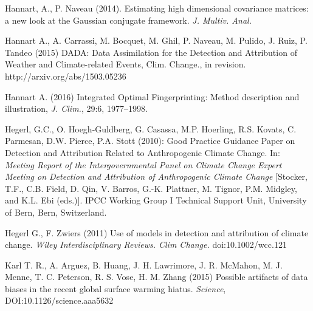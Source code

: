 \documentclass[12pt]{article}
\begin{document}
\begin{thebibliography}{00}
Hannart, A., P. Naveau (2014). Estimating high dimensional covariance matrices: a new look at the Gaussian conjugate framework. {\em J. Multiv. Anal.}

Hannart A., A. Carrassi, M. Bocquet, M. Ghil, P. Naveau, M. Pulido, J. Ruiz, P. Tandeo (2015) DADA: Data Assimilation for the Detection and Attribution of Weather and Climate-related Events, {Clim. Change.}, in revision. http://arxiv.org/abs/1503.05236

Hannart A. (2016) Integrated Optimal Fingerprinting: Method description and illustration, {\em J. Clim.}, 29:6, 1977--1998.

%
%

Hegerl, G.C., O. Hoegh-Guldberg, G. Casassa, M.P. Hoerling, R.S. Kovats, C. Parmesan, D.W. Pierce, P.A. Stott (2010): Good Practice Guidance Paper on Detection and Attribution Related to Anthropogenic Climate Change. In: {\em Meeting Report of the Intergovernmental Panel on Climate Change Expert Meeting on Detection and Attribution of Anthropogenic Climate Change} [Stocker, T.F., C.B. Field, D. Qin, V. Barros, G.-K. Plattner, M. Tignor, P.M. Midgley, and K.L. Ebi (eds.)]. IPCC Working Group I Technical Support Unit, University of Bern, Bern, Switzerland.

Hegerl G., F. Zwiers (2011) Use of models in detection and attribution of climate change. {\em Wiley Interdisciplinary Reviews. Clim Change.} doi:10.1002/wcc.121


Karl T. R., A. Arguez, B. Huang, J. H. Lawrimore, J. R. McMahon, M. J. Menne, T. C. Peterson, R. S. Vose, H. M. Zhang (2015) Possible artifacts of data biases in the recent global surface warming hiatus. {\em Science}, DOI:10.1126/science.aaa5632


\end{thebibliography}
\end{document}
